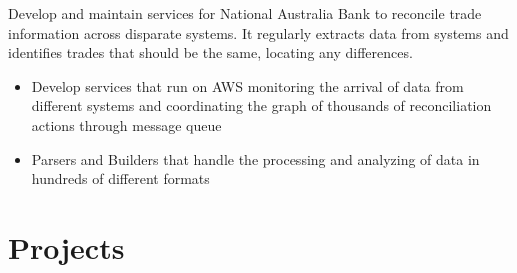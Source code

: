 \documentclass{resume}
\begin{document}
\begin{flushleft}
Develop and maintain services for National Australia Bank to reconcile trade information across disparate systems. It regularly extracts data from systems and identifies trades that should be the same, locating any differences.
\begin{itemize}
  \item Develop services that run on AWS monitoring the arrival of data from different systems and coordinating the graph of thousands of reconciliation actions through message queue
  \item Parsers and Builders that handle the processing and analyzing of data in hundreds of different formats
\end{itemize}
\end{flushleft}

\section{Projects}
\end{document}
